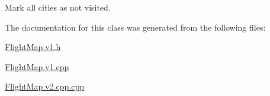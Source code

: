 Mark all cities as not visited. 



The documentation for this class was generated from the following files\+:\begin{DoxyCompactItemize}
\item 
\hyperlink{_flight_map_8v1_8h}{Flight\+Map.\+v1.\+h}\item 
\hyperlink{_flight_map_8v1_8cpp}{Flight\+Map.\+v1.\+cpp}\item 
\hyperlink{_flight_map_8v2_8cpp_8cpp}{Flight\+Map.\+v2.\+cpp.\+cpp}\end{DoxyCompactItemize}
